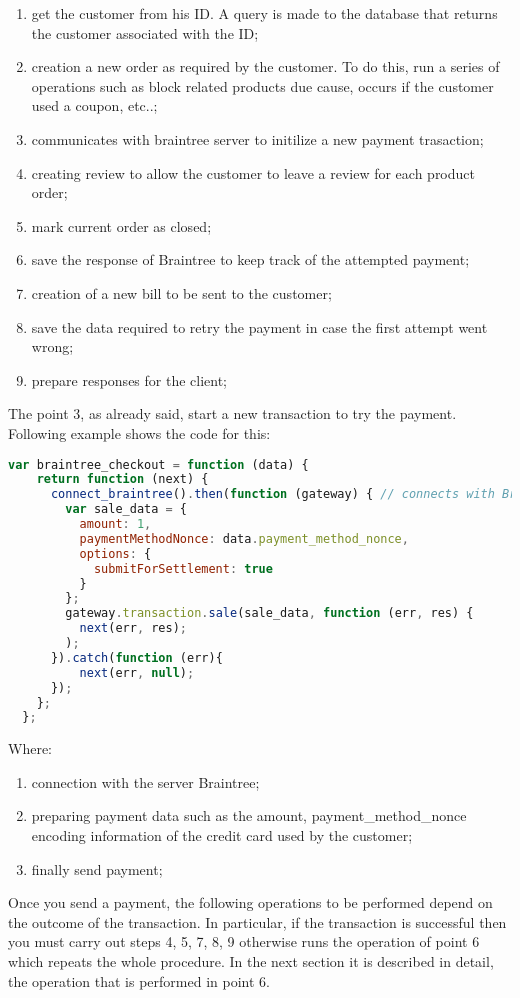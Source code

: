 \begin{enumerate}
\item get the customer from his ID. A query is made to the database that returns the customer associated with the ID;
\item creation a new order as required by the customer. To do this, run a series of operations such as block related products due cause, occurs if the customer used a coupon, etc..;
\item communicates with braintree server to initilize a new payment trasaction;
\item creating review to allow the customer to leave a review for each product order;
\item mark current order as closed;
\item save the response of Braintree to keep track of the attempted payment;
\item creation of a new bill to be sent to the customer;
\item save the data required to retry the payment in case the first attempt went wrong;
\item prepare responses for the client;
\end{enumerate}
The point 3, as already said, start a new transaction to try the payment. Following example shows the code for this:
\begin{lstlisting}[language=javascript]
  var braintree_checkout = function (data) {
    return function (next) {
      connect_braintree().then(function (gateway) { // connects with Braintree server
        var sale_data = {
          amount: 1,
          paymentMethodNonce: data.payment_method_nonce,
          options: {
            submitForSettlement: true
          }
        };
        gateway.transaction.sale(sale_data, function (err, res) {
          next(err, res);
        );
      }).catch(function (err){
          next(err, null);
      });
    };
  };
\end{lstlisting}
Where:
\begin{enumerate}
\item connection with the server Braintree;
\item preparing payment data such as the amount, payment\_method\_nonce encoding information of the credit card used by the customer;
\item finally send payment;
\end{enumerate}
Once you send a payment, the following operations to be performed depend on the outcome of the transaction. In particular, if the transaction is successful then you must carry out steps 4, 5, 7, 8, 9 otherwise runs the operation of point 6 which repeats the whole procedure.
\newline
In the next section it is described in detail, the operation that is performed in point 6.
